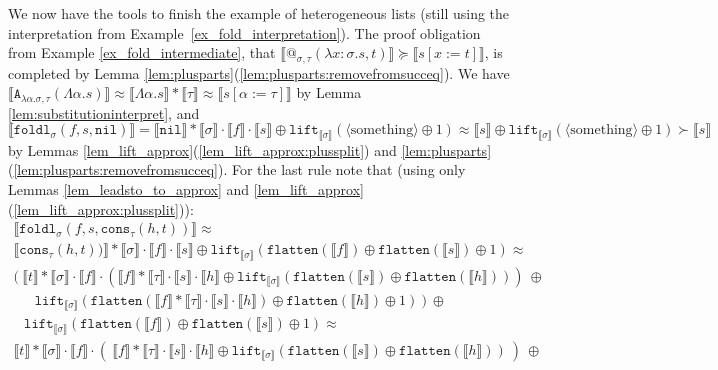 \documentclass[a4paper,UKenglish,cleveref,autoref,numberwithinsect]{lipics-v2019}
\theoremstyle{definition}
\newcommand{\abs}[2]{\lambda #1.#2}
\newcommand{\tabs}[2]{\Lambda #1.#2}
\newcommand{\flatten}{\mathtt{flatten}}
\newcommand{\lift}{\mathtt{lift}}
\newcommand{\typeinterpret}[1]{\llbracket #1 \rrbracket}
\newcommand{\interpret}[1]{\llbracket #1 \rrbracket}
\newcommand{\nil}{\mathtt{nil}}
\newcommand{\cons}{\mathtt{cons}}
\begin{document}
\begin{example}\label{ex_fold_final}
We now have the tools to finish the example of
heterogeneous lists (still using the interpretation from
Example~\ref{ex_fold_interpretation}).  The proof obligation from Example
\ref{ex_fold_intermediate}, that
$\interpret{@_{\sigma,\tau}(\abs{x:\sigma}{s},t)} \succeq
\interpret{s[x:=t]}$, is completed by
Lemma \ref{lem:plusparts}(\ref{lem:plusparts:removefromsucceq}).
We have $\interpret{\mathtt{A}_{\abs{\alpha}{\sigma},
\tau}(\tabs{\alpha}{s})} \approx \interpret{\tabs{\alpha}{s}} *
\typeinterpret{\tau} \approx \interpret{s[\alpha:=\tau]}$ by Lemma
\ref{lem:substitutioninterpret}, and
$\interpret{\mathtt{foldl}_\sigma(f,s,\nil)} =
\interpret{\nil}*\typeinterpret{\sigma} \cdot \interpret{f} \cdot
\interpret{s} \oplus \lift_{\typeinterpret{\sigma}}(\langle
\text{something}\rangle\oplus 1) \approx \interpret{s} \oplus
\lift_{\typeinterpret{\sigma}}(\langle\text{something}\rangle\oplus 1)
\succ \interpret{s}$ by Lemmas
\ref{lem_lift_approx}(\ref{lem_lift_approx:plussplit}) and
\ref{lem:plusparts}(\ref{lem:plusparts:removefromsucceq}).
%
For the last rule note that (using only Lemmas
\ref{lem_leadsto_to_approx} and
\ref{lem_lift_approx}(\ref{lem_lift_approx:plussplit})):
\[
\begin{array}{l}
\interpret{\mathtt{foldl}_\sigma(f,s,\cons_\tau(h,t))} \approx \\
\interpret{\cons_\tau(h,t))} * \typeinterpret{\sigma} \cdot \interpret{f}
\cdot \interpret{s} \oplus \lift_{\typeinterpret{\sigma}}(
\flatten(\interpret{f}) \oplus \flatten(\interpret{s}) \oplus 1) \approx \\
(\ \interpret{t} * \typeinterpret{\sigma} \cdot \interpret{f} \cdot
(\interpret{f} * \typeinterpret{\tau} \cdot \interpret{s}
\cdot \interpret{h} \oplus
\lift_{\typeinterpret{\sigma}}(\flatten(\interpret{s}) \oplus
\flatten(\interpret{h})))\ \oplus \\
\phantom{AB}
\lift_{\typeinterpret{\sigma}}(\flatten(\interpret{f} *
\typeinterpret{\tau} \cdot \interpret{s} \cdot \interpret{h}) \oplus
\flatten(\interpret{h}) \oplus 1)\ )\ \oplus \\
\phantom{A}
 \lift_{\typeinterpret{\sigma}}(\flatten(\interpret{f}) \oplus
 \flatten(\interpret{s}) \oplus 1) \approx \\
\interpret{t} * \typeinterpret{\sigma} \cdot \interpret{f} \cdot
(\ \interpret{f} * \typeinterpret{\tau} \cdot \interpret{s}
\cdot \interpret{h} \oplus
\lift_{\typeinterpret{\sigma}}(\flatten(\interpret{s}) \oplus
\flatten(\interpret{h}))\ )\ \oplus \\

\end{array}\]
\end{example}
\end{document}
